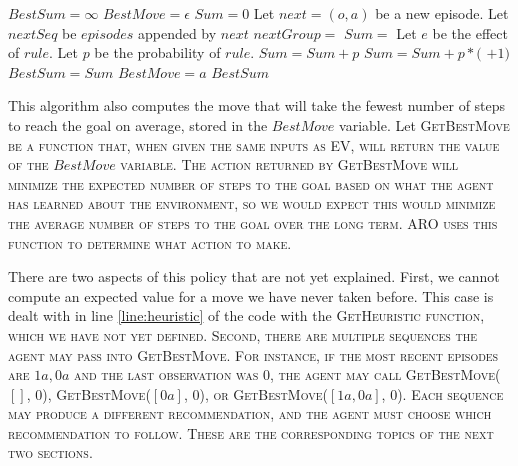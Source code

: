 \documentclass[letterpaper]{article} %
\begin{document}
\algrenewcommand\algorithmicindent{1.25em}
\begin{algorithmic}[1]
		\State $BestSum = \infty$
		\State $BestMove = \epsilon$
			\State $Sum = 0$
			\State Let $next = (o, a)$ be a new episode.
			\State Let $nextSeq$ be $episodes$ appended by $next$
			\State $nextGroup =$  %
				\State $Sum = $  \label{line:heuristic}
			\EndIf
				\State Let $e$ be the effect of $rule$.
				\State Let $p$ be the probability of $rule$.
					\State $Sum = Sum + p$
				\Else
					\State $Sum = Sum + p*($ $ + 1)$
				\EndIf
			\EndFor
				\State $BestSum = Sum$
				\State $BestMove = a$
			\EndIf
		\EndFor
	\State \Return $BestSum$
	\EndFunction
\end{algorithmic}

This algorithm also computes the move that will take the fewest number of steps to reach the goal on average, stored in the $BestMove$ variable. Let \scshape GetBestMove \normalfont be a function that, when given the same inputs as \scshape EV\normalfont, will return the value of the $BestMove$ variable. The action returned by \scshape GetBestMove \normalfont will minimize the expected number of steps to the goal based on what the agent has learned about the environment, so we would expect this would minimize the average number of steps to the goal  over the long term. ARO uses this function to determine what action to make.

There are two aspects of this policy that are not yet explained. First, we cannot compute an expected value for a move we have never taken before. This case is dealt with in line \ref{line:heuristic} of the code with the \scshape GetHeuristic \normalfont function, which we have not yet defined. Second, there are multiple sequences the agent may pass into \scshape GetBestMove\normalfont. For instance, if the most recent episodes are $1a,0a$ and the last observation was $0$, the agent may call \scshape GetBestMove\normalfont($[]$, $0$), \scshape GetBestMove\normalfont($[0a]$, $0$), or \scshape GetBestMove\normalfont($[1a, 0a]$, $0$). Each sequence may produce a different recommendation, and the agent must choose which recommendation to follow. These are the corresponding topics of the next two sections.
\end{document}
